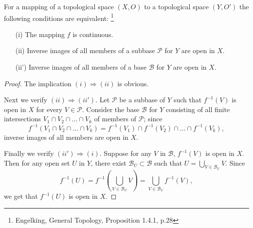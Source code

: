 \begin{proposition} \label{P:cont_base}
For a mapping of a topological space $(X,O)$ to a topological space $(Y,O')$ the
following conditions are equivalent:
  \footnote{Engelking, General Topology, Proposition 1.4.1, p.28}
\begin{enumerate}
  \item[(i)] The mapping $f$ is continuous.
  \item[(ii)] Inverse images of all members of a subbase $\mathcal{P}$ for $Y$
     are open in $X$.
  \item[(ii')] Inverse images of all members of a base $\mathcal{B}$ for $Y$
     are open in $X$.
\end{enumerate}
\end{proposition} 
\begin{proof}
The implication $(i)\Rightarrow (ii)$ is obvious.

Next we verify $(ii)\Rightarrow (ii')$. Let $\mathcal{P}$ be a subbase of $Y$
such that $f^{-1}(V)$ is open in $X$ for every $V\in\mathcal{P}$. Consider the
base $\mathcal{B}$ for $Y$ consisting of all finite intersections 
$V_1\cap V_2\cap \dots\cap V_k$ of members of $\mathcal{P}$; since
\[
  f^{-1}(V_1\cap V_2\cap \dots\cap V_k)
  = f^{-1}(V_1) \cap f^{-1}(V_2) \cap \dots\cap f^{-1}(V_k),
\]
inverse images of all members are open in $X$.

Finally we verify $(ii')\Rightarrow (i)$. Suppose for any $V$ in $\mathcal{B}$,
$f^{-1}(V)$ is open in $X$. Then for any open set $U$ in $Y$, there exist 
$\mathcal{B}_U\subset \mathcal{B}$ such that $U=\bigcup_{V\in \mathcal{B}_U} V$.
Since
\[
  f^{-1}(U) = f^{-1}(\bigcup_{V\in \mathcal{B}_U} V)
            = \bigcup_{V\in \mathcal{B}_U} f^{-1}(V),
\]
we get that $f^{-1}(U)$ is open in $X$.
\end{proof}














